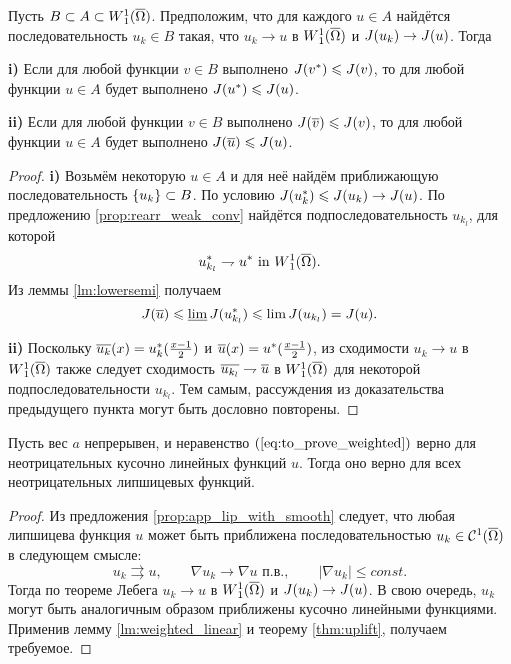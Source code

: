 \begin{thm}
\label{thm:uplift}
Пусть $B \subset A \subset \W(\overline{\Omega})$.
Предположим, что для каждого $u \in A$ найдётся последовательность $u_k \in B$ такая,
что $u_k \to u$ в $\W(\overline{\Omega})$ и $J( u_k ) \to J( u )$.
Тогда

\textbf{\textup{i)}}
Если для любой функции $v \in B$ выполнено $J( {v^*} ) \leqslant J( v )$,
то для любой функции $u \in A$ будет выполнено $J( {u^*} ) \leqslant J( u )$.

\textbf{\textup{ii)}}
Если для любой функции $v \in B$ выполнено $\IWg( \mon{v} ) \le \IWg( v )$,
то для любой функции $u \in A$ будет выполнено $\IWg( \mon{u} ) \le \IWg( u )$.
\end{thm}

\begin{proof}
\textbf{\textup{i)}}
Возьмём некоторую $u \in A$ и для неё найдём приближающую последовательность $\{u_k\} \subset B$.
По условию $J({u_k^*}) \leqslant J(u_k) \to J(u)$.
По предложению \ref{prop:rearr_weak_conv} найдётся подпоследовательность $u_{k_l}$, для которой
$$
\symm{u_{k_l}} \rightharpoondown \symm{u} \text{ in } \W(\overline{\Omega}).
$$
Из леммы \ref{lm:lowersemi} получаем
$$
\IWg(\mon{u}) \le \varliminf \IWg(\symm{u_{k_l}}) \le \lim \IWg(u_{k_l}) = \IWg(u).
$$

\textbf{\textup{ii)}}
Поскольку $\mon{u_k}( x ) = \symm{u_k}( \frac{x - 1}{2} )$ и $\mon{u}( x ) = \symm{u}( \frac{x - 1}{2} )$,
из сходимости $u_k \to u$ в $\W(\overline{\Omega})$ также следует сходимость $\mon{u_{k_l}} \rightharpoondown \mon{u}$ в $\W(\overline{\Omega})$
для некоторой подпоследовательности $u_{k_l}$.
Тем самым, рассуждения из доказательства предыдущего пункта могут быть дословно повторены.
\end{proof}

\begin{cor}
Пусть вес $a$ непрерывен, и неравенство $(\ref{eq:to_prove_weighted})$ верно для неотрицательных кусочно линейных функций $u$.
Тогда оно верно для всех неотрицательных липшицевых функций.
\end{cor}
\begin{proof}
Из предложения \ref{prop:app_lip_with_smooth} следует, что любая липшицева функция $u$ может быть приближена последовательностью $u_k \in \Cont^1(\overline{\Omega})$ в следующем смысле:
$$
u_k \rightrightarrows u, \qquad \nabla u_k \to \nabla u \text{ п.в.}, \qquad |\nabla u_k| \le const.
$$
Тогда по теореме Лебега $u_k \to u$ в $\W(\overline{\Omega})$ и $J( u_k ) \to J( u )$.
В свою очередь, $u_k$ могут быть аналогичным образом приближены кусочно линейными функциями.
Применив лемму \ref{lm:weighted_linear} и теорему \ref{thm:uplift}, получаем требуемое.
\end{proof}
